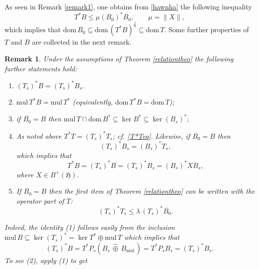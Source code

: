 \documentclass{amsart}
\newtheorem{remark}[theorem]{Remark}
\newcommand{\n}{\|}
\newcommand{\h}{\mathfrak{H}}
\newcommand{\mul}{\mathrm{mul} \, }
\newcommand{\dombar}{\overline{\mathrm{dom}}\,}%
\newcommand{\D}{\mathrm{dom}\,}
\newcommand{\DT}{\mathrm{dom}\,T }
\newcommand{\adj}{^*}
\newcommand{\ts}{T_s}
\newcommand{\tstar}{T^{*}}
\newcommand{\halftsb}{( T^*B)^{\frac{1}{2}}}
\newcommand{\inclu}{\subseteq}
\newcommand{\lplus}{B^{+}(\h)}
\numberwithin{equation}{section}
\begin{document}
As seen in Remark \ref{remark1}, one obtains from \eqref{hawnha} the following inequality
$$
 \tstar B \leq  \mu  (B_0)\adj   \overline{B_0}, \qquad \mu = \n X \n,
$$
which implies that $\D \overline{B_0} \inclu \D \halftsb \inclu \DT.$  Some further properties of  $T$ and $B$ are collected in  the next remark.
 \begin{remark}
 \normalfont Under the assumptions of Theorem \ref{relationtheo} the following further statements hold:
\begin{enumerate}
 \item $ (\ts)\adj B =(T_s)^*B_s.$
 \item    $ \mul T^*B = \mul \tstar  $ (equivalently, $ \dombar \tstar B=\dombar T$);
 \item if $ \overline{B_0}= B$ then $\mul T \cap \D B\adj \inclu \ker B\adj \inclu \ker (B_s)\adj;$
\item  As noted above $T^*T=(T_s)^*T_s$; cf. \eqref{T*Teq}. Likewise, if $ \overline{B_0}= B$ then
      \begin{equation}\label{abersab}
        (\ts)\adj B_s  =  (B_s)\adj \ts,
      \end{equation}
   which implies that
      \begin{equation}\label{abersab2}
        \tstar B = (\ts)\adj B= (\ts)\adj B_s=  (B_s)\adj X  B_s,
      \end{equation}
      where $X \in \lplus.$
\item If $ \overline{B_0}= B$ then the first item of Theorem \ref{relationtheo} can be written with the operator part of $T$:
      $$
      (\ts)\adj \ts \leq \lambda \, (\ts)\adj \overline{B_0}.
      $$
      \end{enumerate}
 \hspace*{0.4cm} Indeed, the identity  \rm (1) follows easily  from the inclusion $\mul B \inclu \ker (\ts)\adj=  \ker  \tstar \oplus \mul T$ which implies that
        \begin{equation*}
        (\ts)\adj B =T^* P_s \left(B_s \,\widehat\oplus\, B_{\mul}\right)= T^*P_s B_s =(T_s)^*B_s.
       \end{equation*}
       \hspace*{0.4cm}  To see  \rm (2),    apply   \rm{(1)} to get

\end{remark}
\end{document}
